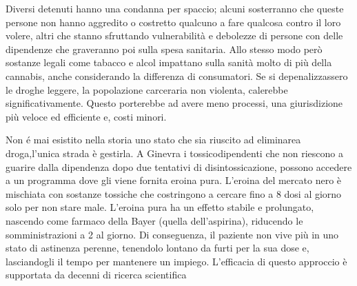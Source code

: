\documentclass[12pt]{book} %
\begin{document}
Diversi detenuti hanno una condanna per spaccio; alcuni sosterranno che queste persone non hanno aggredito o costretto qualcuno a fare qualcosa contro il loro volere, altri che stanno sfruttando vulnerabilità e debolezze di persone con delle dipendenze che graveranno poi sulla spesa sanitaria. Allo stesso modo però sostanze legali come tabacco e alcol impattano sulla sanità molto di più della cannabis, anche considerando la differenza di consumatori.
Se si depenalizzassero le droghe leggere, la popolazione carceraria non violenta, calerebbe significativamente. Questo porterebbe ad avere meno processi, una giurisdizione più veloce ed efficiente e, costi minori. 

Non é mai esistito nella storia uno stato che sia riuscito ad eliminarea droga,l'unica strada è gestirla. A Ginevra i tossicodipendenti che non riescono a guarire dalla dipendenza dopo due tentativi di disintossicazione, possono accedere a un programma dove gli viene fornita eroina pura. L'eroina del mercato nero è mischiata con sostanze tossiche che costringono a cercare fino a 8 dosi al giorno solo per non stare male. L'eroina pura ha un effetto stabile e prolungato, nascendo come farmaco della Bayer (quella dell'aspirina), riducendo le somministrazioni a 2 al giorno. Di conseguenza, il paziente non vive più in uno stato di astinenza perenne, tenendolo lontano da furti per la sua dose e, lasciandogli il tempo per mantenere un impiego.
L'efficacia di questo approccio è supportata da decenni di ricerca scientifica    
 
\end{document}
